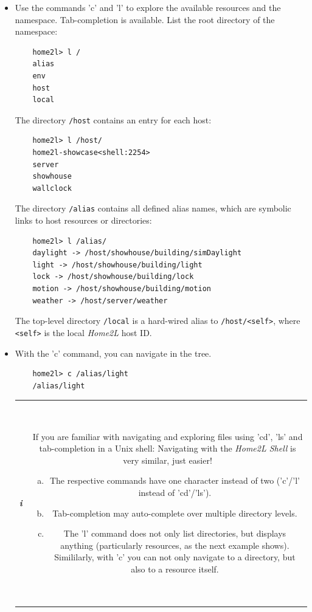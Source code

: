 \documentclass[12pt,english,parskip=half]{scrreprt}
\newcommand{\infobox}[1]{
  \hfill
  \setlength\arrayrulewidth{1pt}
  \begin{tabular}[t]{c|c|}
    \parbox{1.8em}{\hfill\textit{\Huge\textbf{i}\,}}
    &
    \,\parbox{0.89\linewidth}{\setlength{\parskip}{0.5em}#1}\,
  \end{tabular}
  \par
}
\begin{document}
\begin{itemize}[$\blacktriangleright$]
\item
  Use the commands 'c' and 'l' to explore the available resources and the namespace.
  Tab-completion is available.
  List the root directory of the namespace:
  \begin{lstlisting}
    home2l> l /
    alias
    env
    host
    local
  \end{lstlisting}

  The directory \texttt{/host} contains an entry for each host:
  \begin{lstlisting}
    home2l> l /host/
    home2l-showcase<shell:2254>
    server
    showhouse
    wallclock
  \end{lstlisting}

  The directory \texttt{/alias} contains all defined alias names, which are symbolic
  links to host resources or directories:
  \begin{lstlisting}
    home2l> l /alias/
    daylight -> /host/showhouse/building/simDaylight
    light -> /host/showhouse/building/light
    lock -> /host/showhouse/building/lock
    motion -> /host/showhouse/building/motion
    weather -> /host/server/weather
  \end{lstlisting}

  The top-level directory \texttt{/local} is a hard-wired alias to
  \texttt{/host/<self>}, where \texttt{<self>} is the local
  \emph{Home2L} host ID.

\item
  With the 'c' command, you can navigate in the tree.
  \begin{lstlisting}
    home2l> c /alias/light
    /alias/light
  \end{lstlisting}

  \infobox{
    If you are familiar with navigating and exploring files using 'cd', 'ls' and
    tab-completion in a Unix shell: Navigating with the \emph{Home2L Shell} is very
    similar, just easier!
    \begin{enumerate}[a)]
      \item The respective commands have one character instead of two ('c'/'l' instead of 'cd'/'ls').
      \item Tab-completion may auto-complete over multiple directory levels.
      \item The 'l' command does not only list directories, but displays anything (particularly resources, as the next example shows). Simililarly, with 'c' you can not only
        navigate to a directory, but also to a resource itself.
    \end{enumerate}
  }


\end{itemize}
\end{document}

